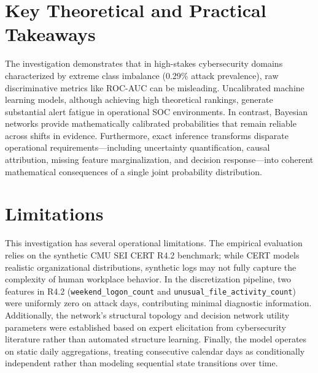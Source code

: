 \documentclass[12pt,a4paper]{report}
\begin{document}
\section{Key Theoretical and Practical Takeaways}
The investigation demonstrates that in high-stakes cybersecurity domains characterized by extreme class imbalance (0.29\% attack prevalence), raw discriminative metrics like ROC-AUC can be misleading. Uncalibrated machine learning models, although achieving high theoretical rankings, generate substantial alert fatigue in operational SOC environments. In contrast, Bayesian networks provide mathematically calibrated probabilities that remain reliable across shifts in evidence. Furthermore, exact inference transforms disparate operational requirements—including uncertainty quantification, causal attribution, missing feature marginalization, and decision response—into coherent mathematical consequences of a single joint probability distribution.

\section{Limitations}
This investigation has several operational limitations. The empirical evaluation relies on the synthetic CMU SEI CERT R4.2 benchmark; while CERT models realistic organizational distributions, synthetic logs may not fully capture the complexity of human workplace behavior. In the discretization pipeline, two features in R4.2 (\texttt{weekend\_logon\_count} and \texttt{unusual\_file\_activity\_count}) were uniformly zero on attack days, contributing minimal diagnostic information. Additionally, the network's structural topology and decision network utility parameters were established based on expert elicitation from cybersecurity literature rather than automated structure learning. Finally, the model operates on static daily aggregations, treating consecutive calendar days as conditionally independent rather than modeling sequential state transitions over time.
\end{document}
